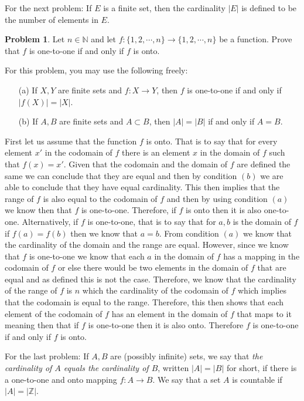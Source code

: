 \documentclass[11pt]{article}
\theoremstyle{definition}
\newtheorem{problem}{Problem}
\newcommand{\N}{\mathbb{N}}
\newcommand{\Z}{\mathbb{Z}}
\begin{document}
For the next problem: If $E$ is a finite set, then the cardinality $|E|$ is defined to be the number of elements in $E$.
\begin{problem}
Let $n \in \N$ and let $f : \{ 1,2,\cdots, n\} \to \{ 1,2,\cdots, n\}$ be a function. 
Prove that $f$ is one-to-one if and only if $f$ is onto. 

For this problem, you may use the following freely:
\begin{itemize}
\item[(a)] If $X, Y$ are finite sets and $f : X \to Y$, then $f$ is one-to-one if and only if $| f(X) | = |X|$. 
\item[(b)] If $A, B$ are finite sets and $A \subset B$, then $|A| = |B|$ if and only if $A = B$. 
\end{itemize}
\end{problem}

First let us assume that the function $f$ is onto. That is to say that for every element $x'$ in the codomain of $f$ there is an element $x$ in the domain of $f$ such that $f(x) = x'$. Given that the codomain and the domain of $f$ are defined the same we can conclude that they are equal and then by condition $(b)$ we are able to conclude that they have equal cardinality. This then implies that the range of $f$ is also equal to the codomain of $f$ and then by using condition $(a)$ we know then that $f$ is one-to-one. Therefore, if $f$ is onto then it is also one-to-one. Alternatively, if $f$ is one-to-one, that is to say that for $a,b$ is the domain of $f$ if $f(a)=f(b)$ then we know that $a=b.$ From condition $(a)$ we know that the cardinality of the domain and the range are equal. However, since we know that $f$ is one-to-one we know that each $a$ in the domain of $f$ has a mapping in the codomain of $f$ or else there would be two elements in the domain of $f$ that are equal and as defined this is not the case. Therefore, we know that the cardinality of the range of $f$ is $n$ which the cardinality of the codomain of $f$ which implies that the codomain is equal to the range. Therefore, this then shows that each element of the codomain of $f$ has an element in the domain of $f$ that maps to it meaning then that if $f$ is one-to-one then it is also onto. Therefore $f$ is one-to-one if and only if $f$ is onto.

\pagebreak

For the last problem: If $A, B$ are (possibly infinite) sets, we say that \emph{the cardinality of $A$ equals the cardinality of $B$}, written $|A| = |B|$ for short, if there is a one-to-one and onto mapping $f : A \to B$. We say that a set $A$ is countable if $|A| = |\Z|$. 
\end{document}
